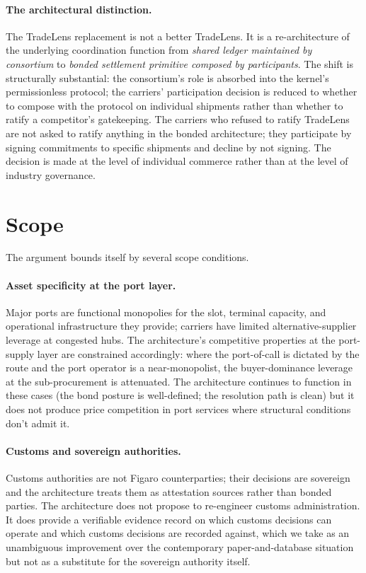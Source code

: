 \documentclass[11pt,a4paper]{article}
\theoremstyle{definition}
\theoremstyle{remark}
\begin{document}
\paragraph{The architectural distinction.}
The TradeLens replacement is not a better TradeLens. It is a
re-architecture of the underlying coordination function from
\emph{shared ledger maintained by consortium} to
\emph{bonded settlement primitive composed by participants}. The
shift is structurally substantial: the consortium's role is
absorbed into the kernel's permissionless protocol; the carriers'
participation decision is reduced to whether to compose with the
protocol on individual shipments rather than whether to ratify a
competitor's gatekeeping. The carriers who refused to ratify
TradeLens are not asked to ratify anything in the bonded
architecture; they participate by signing commitments to specific
shipments and decline by not signing. The decision is made at
the level of individual commerce rather than at the level of
industry governance.

\section{Scope}
\label{sec:scope}

The argument bounds itself by several scope conditions.

\paragraph{Asset specificity at the port layer.}
Major ports are functional monopolies for the slot, terminal
capacity, and operational infrastructure they provide; carriers
have limited alternative-supplier leverage at congested hubs.
The architecture's competitive properties at the port-supply
layer are constrained accordingly: where the port-of-call is
dictated by the route and the port operator is a near-monopolist,
the buyer-dominance leverage at the sub-procurement is
attenuated. The architecture continues to function in these
cases (the bond posture is well-defined; the resolution path is
clean) but it does not produce price competition in port
services where structural conditions don't admit it.

\paragraph{Customs and sovereign authorities.}
Customs authorities are not Figaro counterparties; their
decisions are sovereign and the architecture treats them as
attestation sources rather than bonded parties. The architecture
does not propose to re-engineer customs administration. It does
provide a verifiable evidence record on which customs decisions
can operate and which customs decisions are recorded against,
which we take as an unambiguous improvement over the contemporary
paper-and-database situation but not as a substitute for the
sovereign authority itself.
\end{document}
